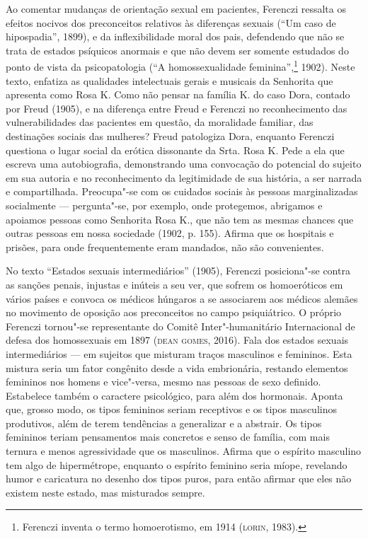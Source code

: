 Ao comentar mudanças de orientação sexual em pacientes, Ferenczi
ressalta os efeitos nocivos dos preconceitos relativos às diferenças
sexuais (``Um caso de hipospadia'', 1899), e da inflexibilidade moral dos
pais, defendendo que não se trata de estados psíquicos anormais e que
não devem ser somente estudados do ponto de vista da psicopatologia (``A
homossexualidade feminina'',\footnote{Ferenczi inventa o termo
  homoerotismo, em 1914 (\textsc{lorin}, 1983).} 1902). Neste texto, enfatiza as
qualidades intelectuais gerais e musicais da Senhorita que apresenta
como Rosa K. Como não pensar na família K. do caso Dora, contado por
Freud (1905), e na diferença entre Freud e Ferenczi no reconhecimento
das vulnerabilidades das pacientes em questão, da moralidade familiar,
das destinações sociais das mulheres? Freud patologiza Dora, enquanto
Ferenczi questiona o lugar social da erótica dissonante da Srta. Rosa K.
Pede a ela que escreva uma autobiografia, demonstrando uma convocação do
potencial do sujeito em sua autoria e no reconhecimento da legitimidade
de sua história, a ser narrada e compartilhada. Preocupa"-se com os
cuidados sociais às pessoas marginalizadas socialmente --- pergunta"-se,
por exemplo, onde protegemos, abrigamos e apoiamos pessoas como
Senhorita Rosa K., que não tem as mesmas chances que outras pessoas em
nossa sociedade (1902, p. 155). Afirma que os hospitais e prisões, para
onde frequentemente eram mandados, não são convenientes.

No texto ``Estados sexuais intermediários'' (1905), Ferenczi posiciona"-se
contra as sanções penais, injustas e inúteis a seu ver, que sofrem os
homoeróticos em vários países e convoca os médicos húngaros a se
associarem aos médicos alemães no movimento de oposição aos preconceitos
no campo psiquiátrico. O próprio Ferenczi tornou"-se representante do
Comitê Inter"-humanitário Internacional de defesa dos homossexuais em 1897
(\textsc{dean gomes}, 2016). Fala dos estados sexuais intermediários --- em
sujeitos que misturam traços masculinos e femininos. Esta mistura seria
um fator congênito desde a vida embrionária, restando elementos
femininos nos homens e vice"-versa, mesmo nas pessoas de sexo definido.
Estabelece também o caractere psicológico, para além dos hormonais.
Aponta que, grosso modo, os tipos femininos seriam receptivos e os tipos
masculinos produtivos, além de terem tendências a generalizar e a
abstrair. Os tipos femininos teriam pensamentos mais concretos e senso
de família, com mais ternura e menos agressividade que os masculinos.
Afirma que o espírito masculino tem algo de hipermétrope, enquanto o
espírito feminino seria míope, revelando humor e caricatura no desenho
dos tipos puros, para então afirmar que eles não existem neste estado,
mas misturados sempre.

